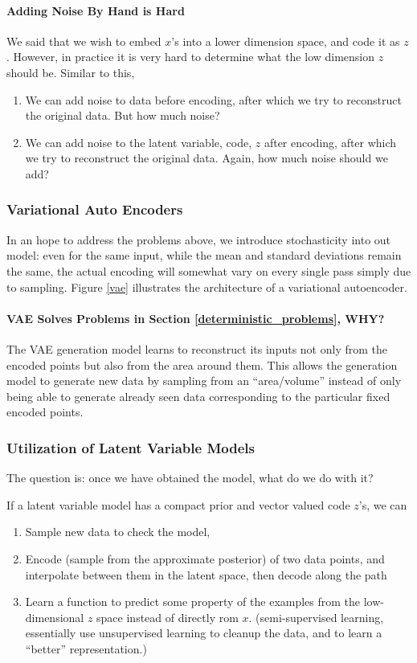 \documentclass[11pt]{article}
\begin{document}
\paragraph{Adding Noise By Hand is Hard} We said that we wish to embed $x$'s into a lower dimension space, and code it as $z$. However, in practice it is very hard to determine what the low dimension $z$ should be. Similar to this, 
\begin{enumerate}
    \item We can add noise to data before encoding, after which we try to reconstruct the original data. But how much noise?
    \item We can add noise to the latent variable, code, $z$ after encoding, after which we try to reconstruct the original data. Again, how much noise should we add?
\end{enumerate}

\subsubsection{Variational Auto Encoders}
In an hope to address the problems above, we introduce stochasticity into out model: even for the same input, while the mean and standard deviations remain the same, the actual encoding will somewhat vary on every single pass simply due to sampling. Figure \ref{vae} illustrates the architecture of a variational autoencoder. 

\paragraph{VAE Solves Problems in Section \ref{deterministic_problems}, WHY?} The VAE generation model learns to reconstruct its inputs not only from the encoded points but also from the area around them. This allows the generation model to generate new data by sampling from an ``area/volume'' instead of only being able to generate already seen data corresponding to the particular fixed encoded points. 

\subsubsection{Utilization of Latent Variable Models} 
The question is: once we have obtained the model, what do we do with it? 

If a latent variable model has a compact prior and vector valued code $z$'s, we can
\begin{enumerate}
    \item Sample new data to check the model,
    \item Encode (sample from the approximate posterior) of two data points, and interpolate between them in the latent space, then decode along the path
    \item Learn a function to predict some property of the examples from the low-dimensional $z$ space instead of directly rom $x$. (semi-supervised learning, essentially use unsupervised learning to cleanup the data, and to learn a ``better'' representation.)
\end{enumerate}
\end{document}
